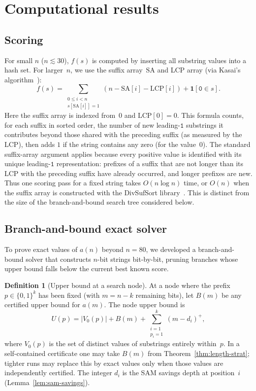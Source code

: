 \documentclass[11pt,a4paper]{article}
\theoremstyle{plain}
\theoremstyle{definition}
\newtheorem{definition}[theorem]{Definition}
\theoremstyle{remark}
\begin{document}
\section{Computational results}\label{sec:computation}

\subsection{Scoring}\label{sec:scoring}

For small $n$ ($n \lesssim 30$), $f(s)$ is computed by inserting all
substring values into a hash set.  For larger~$n$, we use the suffix
array~$\mathrm{SA}$ and LCP array (via Kasai's
algorithm~\cite{kasai2001}):
\[
  f(s) = \sum_{\substack{0 \le i < n \\ s[\mathrm{SA}[i]] = 1}}
    (n - \mathrm{SA}[i] - \mathrm{LCP}[i])
    + \mathbf{1}[\mathtt{0} \in s].
\]
Here the suffix array is indexed from~$0$ and $\mathrm{LCP}[0]=0$.
This formula counts, for each suffix in sorted order, the number of
new leading-$\mathtt{1}$ substrings it contributes beyond those
shared with the preceding suffix (as measured by the LCP), then adds
$1$ if the string contains any zero (for the value~$0$).  The
standard suffix-array argument applies because every positive value is
identified with its unique leading-$\mathtt{1}$ representation:
prefixes of a suffix that are not longer than its LCP with the
preceding suffix have already occurred, and longer prefixes are new.
Thus one scoring pass for a fixed string takes $O(n \log n)$ time, or
$O(n)$ when the suffix array is constructed with the DivSufSort
library~\cite{pydivsufsort}.  This is distinct from the size of the
branch-and-bound search tree considered below.

\subsection{Branch-and-bound exact solver}\label{sec:bb-solver}

To prove exact values of $a(n)$ beyond $n = 80$, we developed a
branch-and-bound solver that constructs $n$-bit strings bit-by-bit,
pruning branches whose upper bound falls below the current best
known score.

\begin{definition}[Upper bound at a search node]
  At a node where the prefix $p \in \{0,1\}^k$ has been fixed
  (with $m = n - k$ remaining bits), let $B(m)$ be any certified upper
  bound for $a(m)$.  The node upper bound is
  \[
    U(p) = |V_0(p)| + B(m) + \sum_{\substack{i=1 \\ p_i=1}}^{k}
    (m - d_i)^+,
  \]
  where $V_0(p)$ is the set of distinct values of substrings
  entirely within~$p$.  In a self-contained certificate one may take
  $B(m)$ from Theorem~\ref{thm:length-strat}; tighter runs may replace
  this by exact values only when those values are independently
  certified.  The integer $d_i$ is the SAM savings depth at
  position~$i$ (Lemma~\ref{lem:sam-savings}).
\end{definition}
\end{document}
